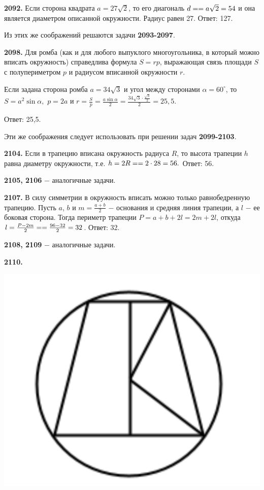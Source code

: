 \textbf{2092.} Если сторона квадрата $a = 27\sqrt{2}$, то его диагональ $d=\linebreak=a\sqrt{2}=54$ и она является диаметром описанной окружности. Радиус равен 27. \newline \null \hspace*{\fill} Ответ: 127.

Из этих же  соображений решаются задачи \textbf{2093-2097}.

\textbf{2098.} Для ромба (как и для любого выпуклого многоугольника, в который можно вписать окружность) справедлива формула $S = rp$, выражающая связь площади $S$ с полупериметром $p$ и радиусом вписанной окружности $r$.

Если задана сторона ромба $a=34\sqrt{3}$ и угол между сторонами $\alpha = 60^\circ$, то $S = a^2 \sin{\alpha},$ $p = 2a$ и $r = \frac{S}{p} = \frac{a\sin{\alpha}}{2}=\frac{34\sqrt{3}\cdot\frac{\sqrt{3}}{2}}{2} = 25,5$.

\null \hspace*{\fill} Ответ: 25,5.

 Эти же соображения следует использовать при решении задач \textbf{2099-2103}.
 
 \textbf{2104.} Если в трапецию вписана окружность радиуса $R$, то высота трапеции $h$ равна диаметру окружности, т.е. $h = 2R = \linebreak = 2\cdot28 = 56.$ \newline \null \hspace*{\fill} Ответ: 56.
 
\textbf{2105, 2106} $-$ аналогичные задачи.

\textbf{2107.}  В силу симметрии в окружность вписать можно только равнобедренную трапецию. Пусть $a$, $b$ и $m = \frac{a+b}{2}$ $-$ основания и средняя линия трапеции, а $l$ $-$ ее боковая сторона. Тогда периметр трапеции $P = a + b+2l = 2m+2l$, откуда $l = \frac{P-2m}{2}=\linebreak =\frac{96-32}{2}=32$. \newline \null \hspace*{\fill} Ответ: 32.

\textbf{2108, 2109} $-$ аналогичные задачи.

\clearpage
\textbf{2110.}

{\centering \includegraphics[width=0.35\linewidth]{Geometry/Content/40.png}
	
}

